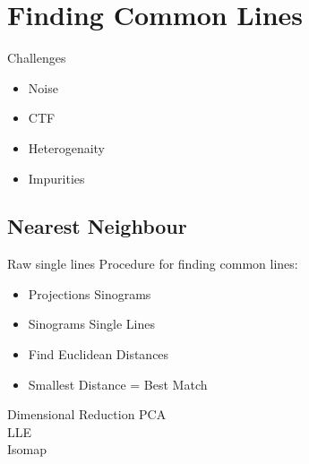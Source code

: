 \documentclass[t, 11pt]{beamer}
\begin{document}


\section{Finding Common Lines}

\begin{frame}[fragile]{Challenges}
    \begin{itemize}
    \item Noise
    \item CTF
    \item Heterogenaity
    \item Impurities
    \end{itemize}
\end{frame}

\subsection*{Nearest Neighbour}

\begin{frame}[fragile]{Raw single lines}
  Procedure for finding common lines: \\
    \begin{itemize}
    \item Projections \textrightarrow{} Sinograms
    \item Sinograms \textrightarrow{} Single Lines
    \item Find Euclidean Distances 
    \item Smallest Distance = Best Match
    \end{itemize}
\end{frame}

\begin{frame}[fragile]{Dimensional Reduction}
  PCA\\
  LLE\\
  Isomap \\

\end{frame}
\end{document}
